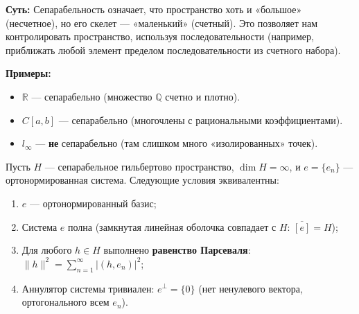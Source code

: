 \begin{idea}
	\textbf{Суть:} Сепарабельность означает, что пространство хоть и «большое» (несчетное), но его скелет — «маленький» (счетный). 
	Это позволяет нам контролировать пространство, используя последовательности (например, приближать любой элемент пределом последовательности из счетного набора).
	
	\textbf{Примеры:}
	\begin{itemize}
		\item $\mathbb{R}$ — сепарабельно (множество $\mathbb{Q}$ счетно и плотно).
		\item $C[a, b]$ — сепарабельно (многочлены с рациональными коэффициентами).
		\item $l_\infty$ — \textbf{не} сепарабельно (там слишком много «изолированных» точек).
	\end{itemize}
\end{idea}

\begin{theorem}\label{thm4.4}
	Пусть $H$ --- сепарабельное гильбертово пространство, $\dim{H} = \infty$, и $e = \{e_n\}$ --- ортонормированная система. Следующие условия эквивалентны:
	\begin{enumerate}
		\item $e$ --- ортонормированный базис;
		\item Система $e$ полна (замкнутая линейная оболочка совпадает с $H$: $\overline{[e]} = H$);
		\item Для любого $h \in H$ выполнено \textbf{равенство Парсеваля}: $\|h\|^2 = \sum_{n = 1}^\infty |(h, e_n)|^2$;
		\item Аннулятор системы тривиален: $e^\perp = \{0\}$ (нет ненулевого вектора, ортогонального всем $e_n$).
	\end{enumerate}
\end{theorem}

